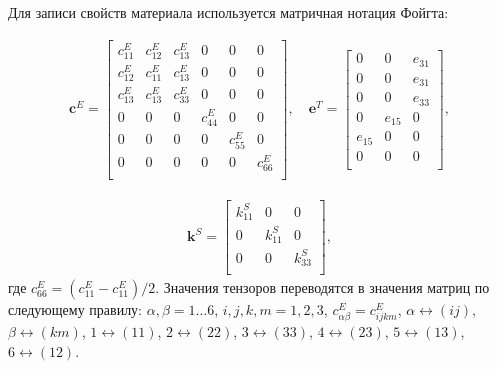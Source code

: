 Для записи свойств материала используется матричная нотация Фойгта:

\[ 
\begin{aligned}
\boldsymbol{c}^E=
\begin{bmatrix}
	c_{11}^E & c_{12}^E & c_{13}^E & 0 & 0 & 0 \\ 
	c_{12}^E & c_{11}^E & c_{13}^E & 0 & 0 & 0 \\ 
	c_{13}^E & c_{13}^E & c_{33}^E & 0 & 0 & 0 \\ 
	0 & 0 & 0 & c_{44}^E & 0 & 0 \\
	0 & 0 & 0 & 0 & c_{55}^E & 0 \\
	0 & 0 & 0 & 0 & 0 & c_{66}^E\\
\end{bmatrix}, \quad
\boldsymbol{e}^T=
\begin{bmatrix}
	0 & 0 & e_{31} \\
	0 & 0 & e_{31} \\
	0 & 0 & e_{33} \\
	0 & e_{15} & 0 \\
	e_{15} & 0 & 0 \\
	0 & 0 & 0 \\
\end{bmatrix}, 
\end{aligned} 
\]



\[
\begin{aligned}
\boldsymbol{k}^S=
\begin{bmatrix}
	k^S_{11} & 0 & 0 \\
	0 & k^S_{11} & 0 \\
	0 & 0 & k^S_{33} \\
\end{bmatrix}, 
\end{aligned} 
\]
где $c_{66}^E=(c_{11}^E-c_{11}^E)/2$.
Значения тензоров переводятся в значения матриц по следующему правилу: $\alpha, \beta =1 \dots 6$, $i,j,k,m = 1,2,3$, $c^E_{\alpha \beta}=c^E_{ijkm}$, $\alpha \leftrightarrow (ij)$, $\beta \leftrightarrow (km)$, 
$1 \leftrightarrow (11)$, 
$2 \leftrightarrow (22)$, 
$3 \leftrightarrow (33)$, 
$4 \leftrightarrow (23)$,
$5 \leftrightarrow (13)$,
$6 \leftrightarrow (12)$.

